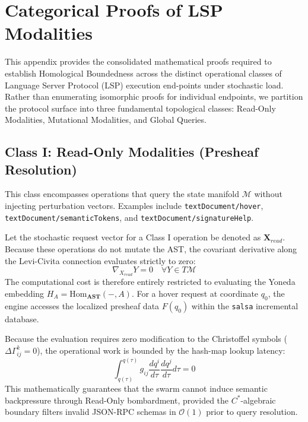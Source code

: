 \chapter{Categorical Proofs of LSP Modalities}
\label{apx:modalities}

This appendix provides the consolidated mathematical proofs required to establish Homological Boundedness across the distinct operational classes of Language Server Protocol (LSP) execution end-points under stochastic load. Rather than enumerating isomorphic proofs for individual endpoints, we partition the protocol surface into three fundamental topological classes: Read-Only Modalities, Mutational Modalities, and Global Queries.

\section{Class I: Read-Only Modalities (Presheaf Resolution)}

This class encompasses operations that query the state manifold $\mathcal{M}$ without injecting perturbation vectors. Examples include \texttt{textDocument/hover}, \texttt{textDocument/semanticTokens}, and \texttt{textDocument/signatureHelp}.

Let the stochastic request vector for a Class I operation be denoted as $\mathbf{X}_{read}$. Because these operations do not mutate the AST, the covariant derivative along the Levi-Civita connection evaluates strictly to zero:
\begin{equation}
\nabla_{X_{read}} Y = 0 \quad \forall Y \in T\mathcal{M}
\end{equation}
The computational cost is therefore entirely restricted to evaluating the Yoneda embedding $H_A = \text{Hom}_{\mathbf{AST}}(-, A)$. For a hover request at coordinate $q_0$, the engine accesses the localized presheaf data $F(q_0)$ within the \texttt{salsa} incremental database. 

Because the evaluation requires zero modification to the Christoffel symbols ($\Delta \Gamma^k_{ij} = 0$), the operational work is bounded by the hash-map lookup latency:
\begin{equation}
\int_{q(\tau)}^{q(\tau)} g_{ij} \frac{dq^i}{d\tau} \frac{dq^j}{d\tau} d\tau = 0
\end{equation}
This mathematically guarantees that the swarm cannot induce semantic backpressure through Read-Only bombardment, provided the $C^*$-algebraic boundary filters invalid JSON-RPC schemas in $\mathcal{O}(1)$ prior to query resolution.

